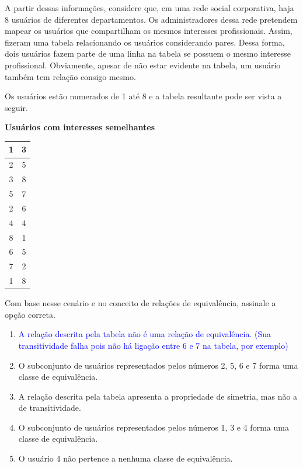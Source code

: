 \documentclass[12pt,a4paper]{article}
\begin{document}
A partir dessas informações, considere que, em uma rede social corporativa, haja 8 usuários de diferentes departamentos. Os administradores dessa rede pretendem mapear os usuários que compartilham os mesmos interesses profissionais. Assim, fizeram uma tabela relacionando os usuários considerando pares. Dessa forma, dois usuários fazem parte de uma linha na tabela se possuem o mesmo interesse profissional. Obviamente, apesar de não estar evidente na tabela, um usuário também tem relação consigo mesmo.

Os usuários estão numerados de 1 até 8 e a tabela resultante pode ser vista a seguir.

\begin{center}
\textbf{Usuários com interesses semelhantes} \\
\vspace{0.2cm}
\begin{tabular}{|c|c|}
\hline
1 & 3 \\ \hline
2 & 5 \\ \hline
3 & 8 \\ \hline
5 & 7 \\ \hline
2 & 6 \\ \hline
4 & 4 \\ \hline
8 & 1 \\ \hline
6 & 5 \\ \hline
7 & 2 \\ \hline
1 & 8 \\ \hline
\end{tabular}
\end{center}

Com base nesse cenário e no conceito de relações de equivalência, assinale a opção correta.
 
\begin{enumerate}[label=\Alph*)]
    \item[\textcolor{blue}{\textbf{A)}}] \textcolor{blue}{A relação descrita pela tabela não é uma relação de equivalência. (Sua transitividade falha pois não há ligação entre 6 e 7 na tabela, por exemplo)}
    \item O subconjunto de usuários representados pelos números 2, 5, 6 e 7 forma uma classe de equivalência.
    \item A relação descrita pela tabela apresenta a propriedade de simetria, mas não a de transitividade.
    \item O subconjunto de usuários representados pelos números 1, 3 e 4 forma uma classe de equivalência.
    \item O usuário 4 não pertence a nenhuma classe de equivalência.
\end{enumerate}
\end{document}
